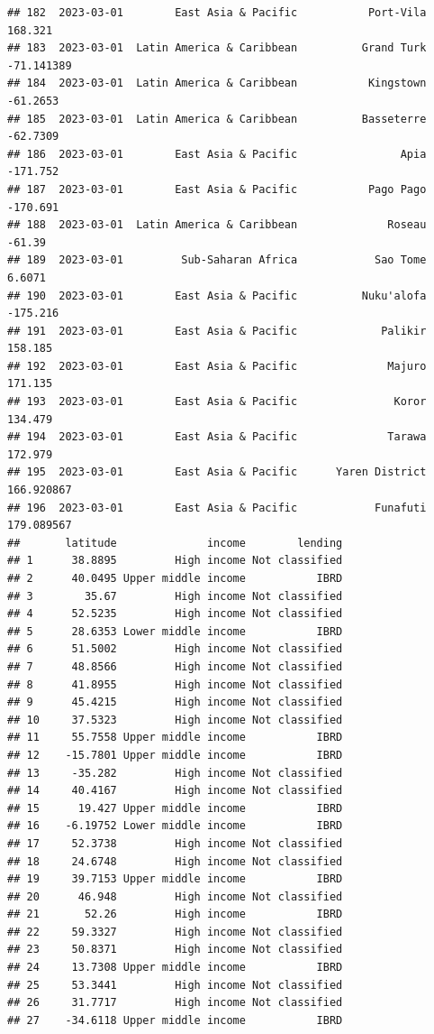 \documentclass[
]{article}
\begin{document}
\begin{verbatim}
## 182  2023-03-01        East Asia & Pacific           Port-Vila    168.321
## 183  2023-03-01  Latin America & Caribbean          Grand Turk -71.141389
## 184  2023-03-01  Latin America & Caribbean           Kingstown   -61.2653
## 185  2023-03-01  Latin America & Caribbean          Basseterre   -62.7309
## 186  2023-03-01        East Asia & Pacific                Apia   -171.752
## 187  2023-03-01        East Asia & Pacific           Pago Pago   -170.691
## 188  2023-03-01  Latin America & Caribbean              Roseau     -61.39
## 189  2023-03-01         Sub-Saharan Africa            Sao Tome     6.6071
## 190  2023-03-01        East Asia & Pacific          Nuku'alofa   -175.216
## 191  2023-03-01        East Asia & Pacific             Palikir    158.185
## 192  2023-03-01        East Asia & Pacific              Majuro    171.135
## 193  2023-03-01        East Asia & Pacific               Koror    134.479
## 194  2023-03-01        East Asia & Pacific              Tarawa    172.979
## 195  2023-03-01        East Asia & Pacific      Yaren District 166.920867
## 196  2023-03-01        East Asia & Pacific            Funafuti 179.089567
##       latitude              income        lending
## 1      38.8895         High income Not classified
## 2      40.0495 Upper middle income           IBRD
## 3        35.67         High income Not classified
## 4      52.5235         High income Not classified
## 5      28.6353 Lower middle income           IBRD
## 6      51.5002         High income Not classified
## 7      48.8566         High income Not classified
## 8      41.8955         High income Not classified
## 9      45.4215         High income Not classified
## 10     37.5323         High income Not classified
## 11     55.7558 Upper middle income           IBRD
## 12    -15.7801 Upper middle income           IBRD
## 13     -35.282         High income Not classified
## 14     40.4167         High income Not classified
## 15      19.427 Upper middle income           IBRD
## 16    -6.19752 Lower middle income           IBRD
## 17     52.3738         High income Not classified
## 18     24.6748         High income Not classified
## 19     39.7153 Upper middle income           IBRD
## 20      46.948         High income Not classified
## 21       52.26         High income           IBRD
## 22     59.3327         High income Not classified
## 23     50.8371         High income Not classified
## 24     13.7308 Upper middle income           IBRD
## 25     53.3441         High income Not classified
## 26     31.7717         High income Not classified
## 27    -34.6118 Upper middle income           IBRD

\end{verbatim}
\end{document}
